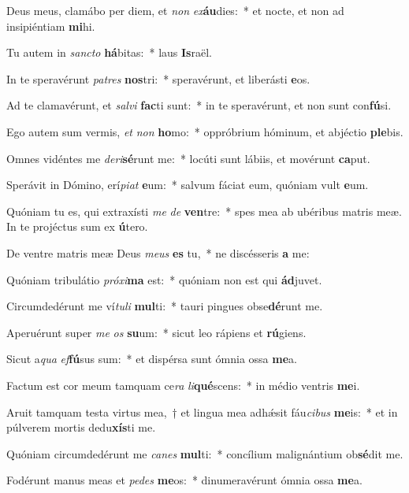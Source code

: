 \item Deus meus, clamábo per diem, et \textit{non} \textit{ex}\textbf{áu}dies:~* et nocte, et non ad insipiéntiam \textbf{mi}hi.
\item Tu autem in \textit{sanc}\textit{to} \textbf{há}bitas:~* laus \textbf{Is}raël.
\item In te speravérunt \textit{pa}\textit{tres} \textbf{nos}tri:~* speravérunt, et liberásti \textbf{e}os.
\item Ad te clamavérunt, et \textit{sal}\textit{vi} \textbf{fac}ti sunt:~* in te speravérunt, et non sunt con\textbf{fú}si.
\item Ego autem sum vermis, \textit{et} \textit{non} \textbf{ho}mo:~* oppróbrium hóminum, et abjéctio \textbf{ple}bis.
\item Omnes vidéntes me \textit{de}\textit{ri}\textbf{sé}runt me:~* locúti sunt lábiis, et movérunt \textbf{ca}put.
\item Sperávit in Dómino, erí\textit{pi}\textit{at} \textbf{e}um:~* salvum fáciat eum, quóniam vult \textbf{e}um.
\item Quóniam tu es, qui extraxísti \textit{me} \textit{de} \textbf{ven}tre:~* spes mea ab ubéribus matris meæ. In te projéctus sum ex \textbf{ú}tero.
\item De ventre matris meæ Deus \textit{me}\textit{us} \textbf{es} tu,~* ne discésseris \textbf{a} me:
\item Quóniam tribulátio \textit{pró}\textit{xi}\textbf{ma} est:~* quóniam non est qui \textbf{ád}juvet.
\item Circumdedérunt me ví\textit{tu}\textit{li} \textbf{mul}ti:~* tauri pingues obse\textbf{dé}runt me.
\item Aperuérunt super \textit{me} \textit{os} \textbf{su}um:~* sicut leo rápiens et \textbf{rú}giens.
\item Sicut a\textit{qua} \textit{ef}\textbf{fú}sus sum:~* et dispérsa sunt ómnia ossa \textbf{me}a.
\item Factum est cor meum tamquam ce\textit{ra} \textit{li}\textbf{qué}scens:~* in médio ventris \textbf{me}i.
\item Aruit tamquam testa virtus mea,~† et lingua mea adhǽsit fáu\textit{ci}\textit{bus} \textbf{me}is:~* et in púlverem mortis dedu\textbf{xís}ti me.
\item Quóniam circumdedérunt me \textit{ca}\textit{nes} \textbf{mul}ti:~* concílium malignántium ob\textbf{sé}dit me.
\item Fodérunt manus meas et \textit{pe}\textit{des} \textbf{me}os:~* dinumeravérunt ómnia ossa \textbf{me}a.
